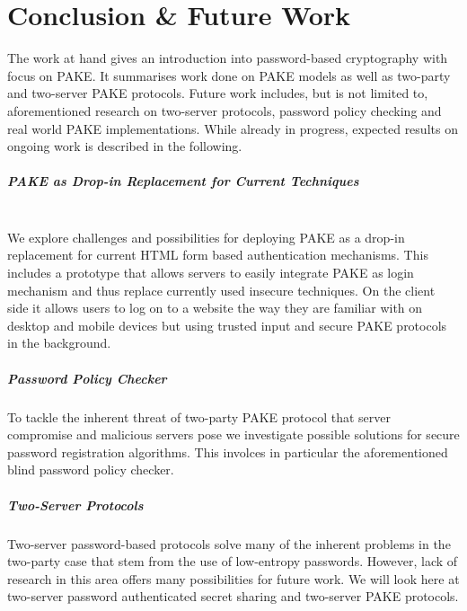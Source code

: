 \chapter{Conclusion \& Future Work}\label{ch:futurework}
The work at hand gives an introduction into password-based cryptography with focus on \acl{PAKE}.
It summarises work done on \ac{PAKE} models as well as two-party and two-server \ac{PAKE} protocols.
Future work includes, but is not limited to, aforementioned research on two-server protocols, password policy checking and real world \ac{PAKE} implementations.
While already in progress, expected results on ongoing work is described in the following.

\paragraph{PAKE as Drop-in Replacement for Current Techniques}\hspace*{1em}\\
We explore challenges and possibilities for deploying \ac{PAKE} as a drop-in replacement for current \ac{HTML} form based authentication mechanisms.
This includes a prototype that allows servers to easily integrate \ac{PAKE} as login mechanism and thus replace currently used insecure techniques.
On the client side it allows users to log on to a website the way they are familiar with on desktop and mobile devices but using trusted input and secure \ac{PAKE} protocols in the background.

\paragraph{Password Policy Checker}
To tackle the inherent threat of two-party \ac{PAKE} protocol that server compromise and malicious servers pose we investigate possible solutions for secure password registration algorithms.
This involces in particular the aforementioned blind password policy checker.

\paragraph{Two-Server Protocols}
Two-server password-based protocols solve many of the inherent problems in the two-party case that stem from the use of low-entropy passwords.
However, lack of research in this area offers many possibilities for future work.
We will look here at two-server password authenticated secret sharing and two-server \ac{PAKE} protocols.


